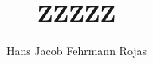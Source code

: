 \documentclass[spanish,letterpaper,singlespace]{templates/uchile-tesis}
\title{ZZZZZ}
\author{Hans Jacob Fehrmann Rojas}
\begin{document}

\listoftodos
\newpage

\maketitle





 



%



\end{document}

